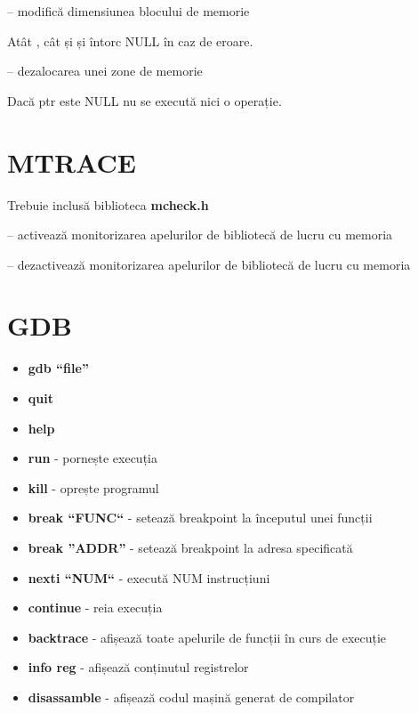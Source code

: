 \documentclass{refcard.cs.pub.ro}
\begin{document}
\begin{multicols*}{3}
 -- modifică dimensiunea
blocului de memorie
\begin{params}
  \param{}{}
\end{params}

Atât , cât și  și  întorc NULL
în caz de eroare. 

 -- dezalocarea unei zone de memorie
\begin{params}
  \param{}{}
\end{params}

Dacă ptr este NULL nu se execută nici o operație.

\section{MTRACE}

Trebuie inclusă biblioteca \textbf{mcheck.h}

 -- activează monitorizarea apelurilor de bibliotecă de lucru cu memoria
\begin{params}
  \param{}{}
\end{params} 

 -- dezactivează monitorizarea apelurilor de bibliotecă de lucru cu memoria \\

\vspace*{0.6cm}
\columnbreak

\section{GDB}

\begin{itemize}
  \item \textbf{gdb ``file''}
  \item \textbf{quit}
  \item \textbf{help}
  \item \textbf{run} - pornește execuția
  \item \textbf{kill} - oprește programul
  \item \textbf{break ``FUNC``} - setează breakpoint la începutul unei funcții
  \item \textbf{break ''ADDR''} - setează breakpoint la adresa specificată
  \item \textbf{nexti ``NUM``} - execută NUM instrucțiuni
  \item \textbf{continue} - reia execuția
  \item \textbf{backtrace} - afișează toate apelurile de funcții în curs de execuție
  \item \textbf{info reg} - afișează conținutul registrelor
  \item \textbf{disassamble} - afișează codul mașină generat de compilator
\end{itemize}


\end{multicols*}
\end{document}
